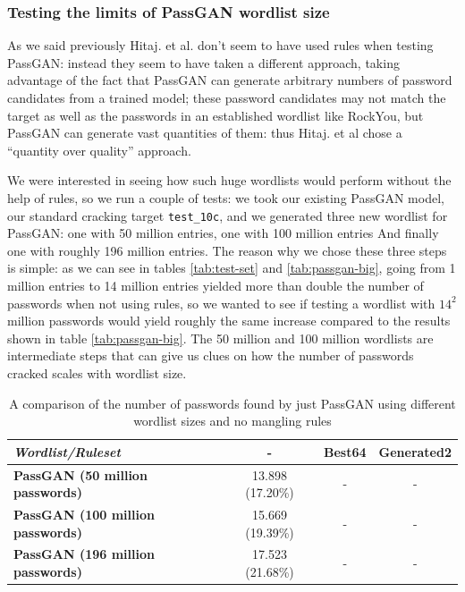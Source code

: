 \subsubsection{Testing the limits of PassGAN wordlist size}\label{subsubsec:huge-wordlists}
As we said previously Hitaj. et al. \cite{PassGAN} don't seem to have used rules when testing PassGAN: instead they seem to have taken a different approach, taking advantage of the fact that PassGAN can generate arbitrary numbers of password candidates from a trained model; these password candidates may not match the target as well as the passwords in an established wordlist like RockYou, but PassGAN can generate vast quantities of them: thus Hitaj. et al chose a \enquote{quantity over quality} approach.

We were interested in seeing how such huge wordlists would perform without the help of rules, so we run a couple of tests: we took our existing PassGAN model, our standard cracking target \texttt{test\_10c}, and we generated three new wordlist for PassGAN: one with 50 million entries, one with 100 million entries And finally one with roughly 196 million entries. 
The reason why we chose these three steps is simple: as we can see in tables \ref{tab:test-set} and \ref{tab:passgan-big}, going from 1 million entries to 14 million entries yielded more than double the number of passwords when not using rules, so we wanted to see if testing a wordlist with $14^2$ million passwords would yield roughly the same increase compared to the results shown in table \ref{tab:passgan-big}. The 50 million and 100 million wordlists are intermediate steps that can give us clues on how the number of passwords cracked scales with wordlist size.

\begin{table}[H]
\centering    
\begin{tabular}{|l|c|c|c|}
\hline
\textbf{\emph{Wordlist/Ruleset}} & \textbf{-} & \textbf{Best64} & \textbf{Generated2} \\ \hline
\textbf{PassGAN (50 million passwords)}          & 13.898 (17.20\%) & - & - \\ \hline
\textbf{PassGAN (100 million passwords)}          & 15.669 (19.39\%) & - & - \\ \hline
\textbf{PassGAN (196 million passwords)}          & 17.523 (21.68\%) & - & - \\ \hline
\end{tabular}
\caption{A comparison of the number of passwords found by just PassGAN using different wordlist sizes and no mangling rules} 
\label{tab:passgan-huge}
\end{table}

